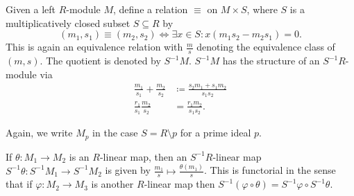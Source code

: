 Given a left $R$-module $M$, define a relation $\equiv$ on $M\times S$, where
$S$ is a multiplicatively closed subset $S \subseteq R$ by
\[ (m_1, s_1) \equiv (m_2, s_2) \iff \exists x \in S\colon x(m_1s_2 - m_2s_1) = 0. \]
This is again an equivalence relation with $\frac{m}{s}$ denoting the equivalence
class of $(m, s)$. The quotient is denoted by $S^{-1}M$. $S^{-1}M$ has the structure
of an $S^{-1}R$-module via
\begin{align*}
	\frac{m_1}{s_1}+ \frac{m_2}{s_2}&\coloneqq \frac{s_2m_1+s_1m_2}{s_1s_2}\\
	\frac{r_1}{s_1}\frac{m_2}{s_2}&= \frac{r_1m_2}{s_1s_2}.
\end{align*}

Again, we write $M_p$ in the case $S = R\setminus p$ for a prime ideal $p$.

If $\theta\colon M_1\to M_2$ is an $R$-linear map, then an $S^{-1}R$-linear map
$S^{-1}\theta\colon S^{-1}M_1\to S^{-1}M_2$ is given by $\frac{m_1}{s}\mapsto\frac{\theta(m_1)}{s}$.
This is functorial in the sense that if  $\varphi\colon M_2\to M_3$ is  another
$R$-linear map then $S^{-1}(\varphi \circ \theta) = S^{-1}\varphi \circ S^{-1}\theta$.
